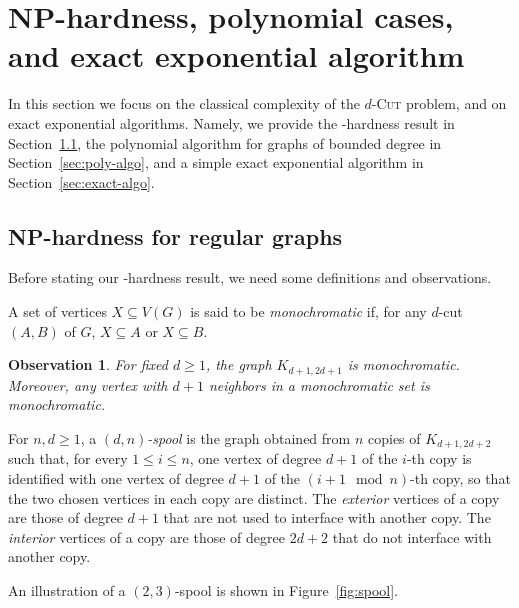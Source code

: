 \documentclass[a4paper,UKenglish,cleveref, autoref]{lipics-v2019}
\newcommand{\ig}[1]{\textcolor{red}{[Ig: #1]}}
\newtheorem{observation}{Observation}
\begin{document}
\section{NP-hardness, polynomial cases, and exact exponential algorithm}
\label{sec:np}

In this section we focus on the classical complexity of the \textsc{$d$-Cut} problem, and on exact exponential algorithms. Namely, we provide the \NP-hardness result in Section~\ref{sec:NP-hard}, the polynomial algorithm for graphs of bounded degree in Section~\ref{sec:poly-algo}, and
a simple exact exponential algorithm in Section~\ref{sec:exact-algo}.

\subsection{NP-hardness for regular graphs}
\label{sec:NP-hard}

Before stating our \NP-hardness result, we need some definitions and observations.

\begin{definition}
    A set of vertices $X \subseteq V(G)$ is said to be \emph{monochromatic} if, for any $d$-cut $(A, B)$ of $G$, $X \subseteq A$ or $X \subseteq B$.
\end{definition}

\begin{observation}
    \label{obs:mono_bipartite}
    For fixed $d \geq 1$, the graph $K_{d+1, 2d+1}$ is monochromatic.
    Moreover, any vertex with $d+1$ neighbors in a monochromatic set is monochromatic.
\end{observation}

\begin{definition}[Spool]
    For $n,d \geq 1$, a \emph{$(d, n)$-spool}  is the graph obtained from $n$  copies of $K_{d+1, 2d+2}$ such that, for every $1 \leq i \leq n$, one vertex of degree $d+1$ of the $i$-th copy is identified with one vertex of degree $d+1$ of the $(i+1 \mod n)$-th copy, so that the two chosen vertices in each copy are distinct. %
    The \emph{exterior} vertices of a copy are those of degree $d+1$ that are not used to interface with another copy.
    The \emph{interior} vertices of a copy are those of degree $2d+2$ that do not interface with another copy.
\end{definition}

An illustration of a $(2,3)$-spool is shown in Figure~\ref{fig:spool}.
\end{document}
